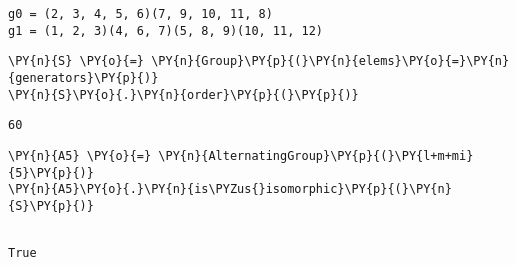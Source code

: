 \begin{enumerate}
    \begin{Verbatim}[commandchars=\\\{\}]
g0 = (2, 3, 4, 5, 6)(7, 9, 10, 11, 8)
g1 = (1, 2, 3)(4, 6, 7)(5, 8, 9)(10, 11, 12)
    \end{Verbatim}

    \begin{tcolorbox}[breakable, size=fbox, boxrule=1pt, pad at break*=1mm,colback=cellbackground, colframe=cellborder]
\begin{Verbatim}[commandchars=\\\{\}]
\PY{n}{S} \PY{o}{=} \PY{n}{Group}\PY{p}{(}\PY{n}{elems}\PY{o}{=}\PY{n}{generators}\PY{p}{)}
\PY{n}{S}\PY{o}{.}\PY{n}{order}\PY{p}{(}\PY{p}{)}
\end{Verbatim}
\end{tcolorbox}

            \begin{tcolorbox}[breakable, size=fbox, boxrule=.5pt, pad at break*=1mm, opacityfill=0]
\begin{Verbatim}[commandchars=\\\{\}]
60
\end{Verbatim}
\end{tcolorbox}
        
    \begin{tcolorbox}[breakable, size=fbox, boxrule=1pt, pad at break*=1mm,colback=cellbackground, colframe=cellborder]
\begin{Verbatim}[commandchars=\\\{\}]
\PY{n}{A5} \PY{o}{=} \PY{n}{AlternatingGroup}\PY{p}{(}\PY{l+m+mi}{5}\PY{p}{)}
\PY{n}{A5}\PY{o}{.}\PY{n}{is\PYZus{}isomorphic}\PY{p}{(}\PY{n}{S}\PY{p}{)}
                    
\end{Verbatim}
\end{tcolorbox}

            \begin{tcolorbox}[breakable, size=fbox, boxrule=.5pt, pad at break*=1mm, opacityfill=0]
\begin{Verbatim}[commandchars=\\\{\}]
True
\end{Verbatim}
\end{tcolorbox}
        
\end{enumerate}
\fi 



